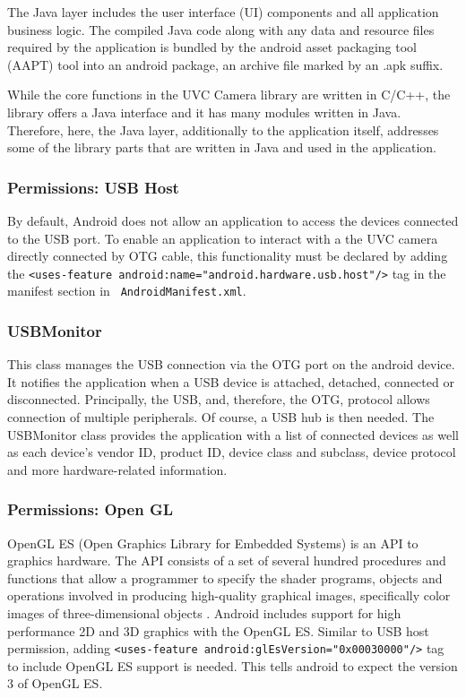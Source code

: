 The Java layer includes the user interface (UI) components and all application business logic.
The compiled Java code along with any data and resource files required by the application is bundled by the android asset packaging tool (AAPT) tool into an android package, an archive file marked by an .apk suffix.

While the core functions in the UVC Camera library are written in C/C++, the library offers a Java interface and it has many modules written in Java. Therefore, here, the Java layer, additionally to the application itself, addresses some of the library parts that are written in Java and used in the application.



\subsubsection{Permissions: USB Host}
By default, Android does not allow an application to access the devices connected to the USB  port. To enable an application to interact with a the UVC camera directly connected by OTG cable, this functionality must be declared by adding the \texttt{<uses-feature android:name="android.hardware.usb.host"/>} tag in the manifest section in \texttt{ AndroidManifest.xml}. 

\subsubsection{USBMonitor}

This class manages the USB connection via the OTG port on the android device. It notifies the application when a USB device is attached, detached, connected or disconnected. Principally, the USB, and, therefore, the OTG, protocol allows connection of multiple peripherals. Of course, a USB hub is then needed. The USBMonitor class provides the application with a list of connected devices as well as each device’s vendor ID, product ID, device class and subclass, device protocol and more hardware-related information.

\subsubsection{Permissions: Open GL}

OpenGL ES (Open Graphics Library for Embedded Systems) is an API to graphics hardware. The API consists of a set of several hundred procedures and functions that allow a programmer to specify the shader programs, objects and operations involved in producing high-quality graphical images, specifically color images of three-dimensional objects \parencite{openGl}.
Android includes support for high performance 2D and 3D graphics with the OpenGL ES. Similar to USB host permission, adding  \texttt{<uses-feature android:glEsVersion="0x00030000"/>} tag to include OpenGL ES support is needed. This tells android to expect the version 3 of OpenGL ES.

